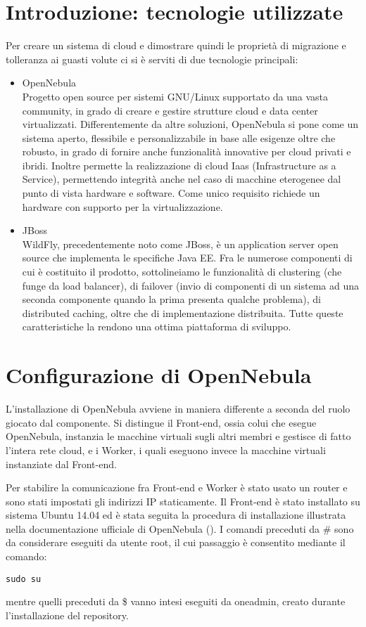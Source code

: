 \documentclass[twoside]{article}
\begin{document}
\section{Introduzione: tecnologie utilizzate}
Per creare un sistema di cloud e dimostrare quindi le proprietà di migrazione e
tolleranza ai guasti volute ci si è serviti di due tecnologie principali:
\begin{itemize}
	\item OpenNebula \\
		  Progetto open source per sistemi GNU/Linux supportato da una vasta community, in grado di
		  creare e gestire strutture cloud e data center virtualizzati. Differentemente da altre soluzioni,
		  OpenNebula si pone come un sistema aperto, flessibile e personalizzabile in base alle esigenze
		  oltre che robusto, in grado di fornire anche funzionalità innovative per cloud privati e ibridi.
		  Inoltre permette la realizzazione di cloud Iaas (Infrastructure as a Service), permettendo integrità
		  anche nel caso di macchine eterogenee dal punto di vista hardware e software. Come unico requisito
		  richiede un hardware con supporto per la virtualizzazione.
	\item JBoss \\
		  WildFly, precedentemente noto come JBoss, è un application server open source che implementa
		  le specifiche Java EE. Fra le numerose componenti di cui è costituito il prodotto, sottolineiamo
		  le funzionalità di clustering (che funge da load balancer), di failover (invio di componenti di
		  un sistema ad una seconda componente quando la prima presenta qualche problema), di distributed
		  caching, oltre che di implementazione distribuita. Tutte queste caratteristiche la rendono una
		  ottima piattaforma di sviluppo.
\end{itemize}

\section{Configurazione di OpenNebula}
L'installazione di OpenNebula avviene in maniera differente a seconda del ruolo giocato dal componente.
Si distingue il Front-end, ossia colui che esegue OpenNebula, instanzia le macchine virtuali sugli altri
membri e gestisce di fatto l'intera rete cloud, e i Worker, i quali eseguono invece la macchine virtuali
instanziate dal Front-end.

Per stabilire la comunicazione fra Front-end e Worker è stato usato un router e sono stati impostati
gli indirizzi IP staticamente. Il Front-end è stato installato su sistema Ubuntu 14.04 ed è stata seguita
la procedura di installazione illustrata nella documentazione ufficiale di OpenNebula (\cite{bib:baseball}).
I comandi preceduti da \# sono da considerare eseguiti da utente root, il cui passaggio è consentito
mediante il comando:
\begin{lstlisting}[frame=trBL]
sudo su
\end{lstlisting}
mentre quelli preceduti da \$ vanno intesi eseguiti da oneadmin, creato durante l'installazione del
repository.
\end{document}
